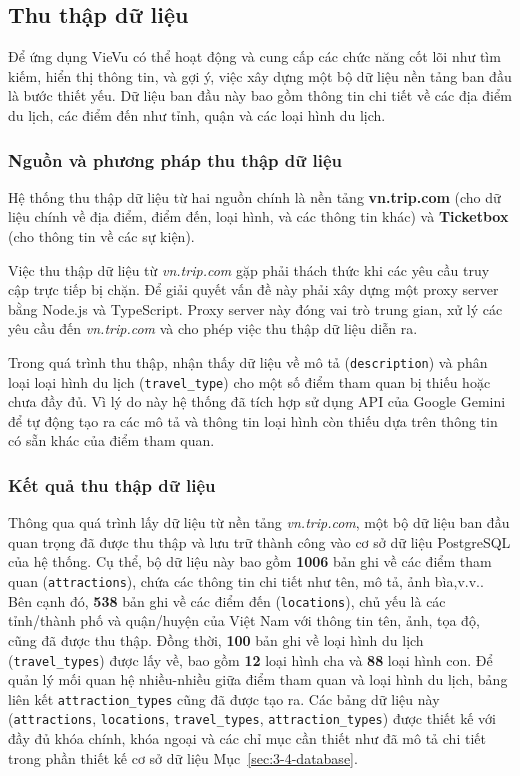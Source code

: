\subsection{Thu thập dữ liệu}


Để ứng dụng VieVu có thể hoạt động và cung cấp các chức năng cốt lõi như tìm kiếm, hiển thị thông tin, và gợi ý, việc xây dựng một bộ dữ liệu nền tảng ban đầu là bước thiết yếu. Dữ liệu ban đầu này bao gồm thông tin chi tiết về các địa điểm du lịch, các điểm đến như tỉnh, quận và các loại hình du lịch.
\subsubsection{Nguồn và phương pháp thu thập dữ liệu}
Hệ thống thu thập dữ liệu từ hai nguồn chính là nền tảng \textbf{vn.trip.com} (cho dữ liệu chính về địa điểm, điểm đến, loại hình, và các thông tin khác) và \textbf{Ticketbox} (cho thông tin về các sự kiện).

Việc thu thập dữ liệu từ \textit{vn.trip.com} gặp phải thách thức khi các yêu cầu truy cập trực tiếp bị chặn. Để giải quyết vấn đề này phải xây dựng một proxy server bằng Node.js và TypeScript. Proxy server này đóng vai trò trung gian, xử lý các yêu cầu đến \textit{vn.trip.com} và cho phép việc thu thập dữ liệu diễn ra.

Trong quá trình thu thập, nhận thấy dữ liệu về mô tả (\texttt{description}) và phân loại loại hình du lịch (\texttt{travel\_type}) cho một số điểm tham quan bị thiếu hoặc chưa đầy đủ. Vì lý do này hệ thống đã tích hợp sử dụng API của Google Gemini để tự động tạo ra các mô tả và thông tin loại hình còn thiếu dựa trên thông tin có sẵn khác của điểm tham quan.

\subsubsection{Kết quả thu thập dữ liệu}
Thông qua quá trình lấy dữ liệu từ nền tảng \textit{vn.trip.com}, một bộ dữ liệu ban đầu quan trọng đã được thu thập và lưu trữ thành công vào cơ sở dữ liệu PostgreSQL của hệ thống. Cụ thể, bộ dữ liệu này bao gồm \textbf{1006} bản ghi về các điểm tham quan (\texttt{attractions}), chứa các thông tin chi tiết như tên, mô tả, ảnh bìa,v.v.. Bên cạnh đó, \textbf{538} bản ghi về các điểm đến (\texttt{locations}), chủ yếu là các tỉnh/thành phố và quận/huyện của Việt Nam với thông tin tên, ảnh, tọa độ, cũng đã được thu thập. Đồng thời, \textbf{100} bản ghi về loại hình du lịch (\texttt{travel\_types}) được lấy về, bao gồm \textbf{12} loại hình cha và \textbf{88} loại hình con. Để quản lý mối quan hệ nhiều-nhiều giữa điểm tham quan và loại hình du lịch, bảng liên kết \texttt{attraction\_types} cũng đã được tạo ra. Các bảng dữ liệu này (\texttt{attractions}, \texttt{locations}, \texttt{travel\_types}, \texttt{attraction\_types}) được thiết kế với đầy đủ khóa chính, khóa ngoại và các chỉ mục cần thiết như đã mô tả chi tiết trong phần thiết kế cơ sở dữ liệu Mục~\ref{sec:3-4-database}. %

